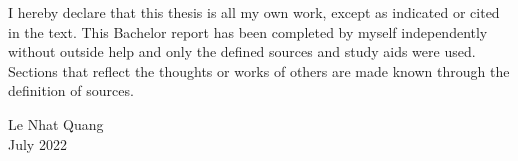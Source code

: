 I hereby declare that this thesis is all my own work, except as indicated or cited in the text. This Bachelor report has been completed by myself independently without outside help and only the defined sources and study aids were used. Sections that reflect the thoughts or works of others are made
known through the definition of sources.

\begin{flushright}
Le Nhat Quang\\
July 2022
\end{flushright}
